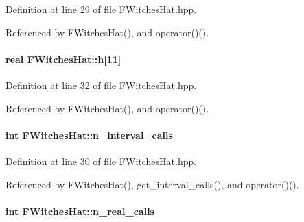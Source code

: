 \-Definition at line 29 of file \-F\-Witches\-Hat.\-hpp.



\-Referenced by \-F\-Witches\-Hat(), and operator()().

\hypertarget{classFWitchesHat_a08793da5b6fee108f85a70f9eaf67e65}{
\paragraph[{h}]{\setlength{\rightskip}{0pt plus 5cm}real {\bf \-F\-Witches\-Hat\-::h}\mbox{[}11\mbox{]}}}\label{classFWitchesHat_a08793da5b6fee108f85a70f9eaf67e65}


\-Definition at line 32 of file \-F\-Witches\-Hat.\-hpp.



\-Referenced by \-F\-Witches\-Hat(), and operator()().

\hypertarget{classFWitchesHat_ae9af30cb2fef292d9eafe3ca42ce4b60}{
\paragraph[{n\-\_\-interval\-\_\-calls}]{\setlength{\rightskip}{0pt plus 5cm}int {\bf \-F\-Witches\-Hat\-::n\-\_\-interval\-\_\-calls}}}\label{classFWitchesHat_ae9af30cb2fef292d9eafe3ca42ce4b60}


\-Definition at line 30 of file \-F\-Witches\-Hat.\-hpp.



\-Referenced by \-F\-Witches\-Hat(), get\-\_\-interval\-\_\-calls(), and operator()().

\hypertarget{classFWitchesHat_ab91e3167c8275b9cec6aa913d55a2ea4}{
\paragraph[{n\-\_\-real\-\_\-calls}]{\setlength{\rightskip}{0pt plus 5cm}int {\bf \-F\-Witches\-Hat\-::n\-\_\-real\-\_\-calls}}}\label{classFWitchesHat_ab91e3167c8275b9cec6aa913d55a2ea4}


